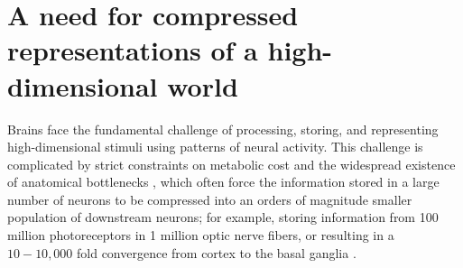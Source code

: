 %

\section{A need for compressed representations of a high-dimensional world}
\label{sec:introduction}

Brains face the fundamental challenge of 
processing, storing, and representing high-dimensional stimuli
using patterns of neural activity.
This challenge is complicated by strict constraints on metabolic cost
\citep{Lennie2003}
and the widespread existence of anatomical bottlenecks 
\citep{Kempermann2002,BarGad2003_Review,Babinsky1993,GanguliSompolinsky2012},
which often force the information stored in a large number of neurons
to be compressed into an orders of magnitude smaller population
of downstream neurons;
for example, storing information from 100 million photoreceptors 
in 1 million optic nerve fibers,
or resulting in a $10 - 10,000$ fold convergence from cortex to the basal ganglia
\citep{GanguliSompolinsky2012}.

